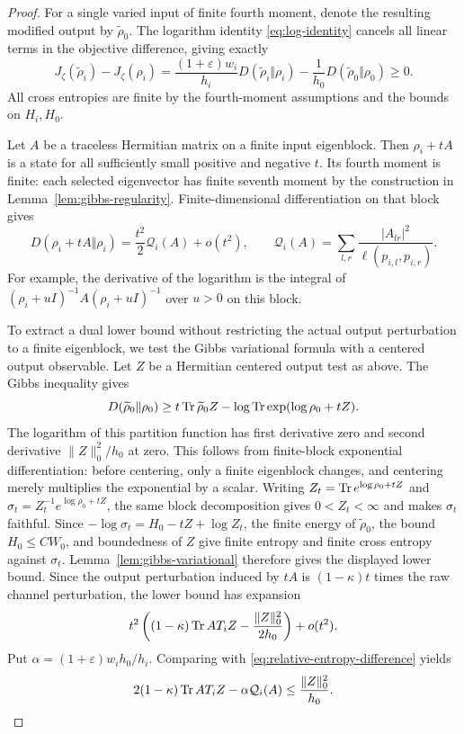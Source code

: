 \begin{proof}
For a single varied input of finite fourth moment, denote the
resulting modified output by $\widetilde\rho_0$. The logarithm
identity \eqref{eq:log-identity} cancels all linear terms in the
objective difference, giving exactly
\begin{equation}\label{eq:relative-entropy-difference}
 J_\zeta(\widetilde\rho_i)-J_\zeta(\rho_i)
 =\frac{(1+\varepsilon)w_i}{h_i}
        D(\widetilde\rho_i\Vert\rho_i)
  -\frac1{h_0}D(\widetilde\rho_0\Vert\rho_0)\ge0.
\end{equation}
All cross entropies are finite by the fourth-moment assumptions and
the bounds on $H_i,H_0$.

Let $A$ be a traceless Hermitian matrix on a finite input eigenblock.
Then $\rho_i+tA$ is a state for all sufficiently small positive and
negative $t$. Its fourth moment is finite: each selected eigenvector
has finite seventh moment by the construction in
Lemma~\ref{lem:gibbs-regularity}. Finite-dimensional differentiation
on that block gives
\[
 D(\rho_i+tA\Vert\rho_i)
 =\frac{t^2}{2}\mathcal Q_i(A)+o(t^2),\qquad
 \mathcal Q_i(A)=\sum_{l,r}
       \frac{|A_{lr}|^2}{\ell(p_{i,l},p_{i,r})}.
\]
For example, the derivative of the logarithm is the integral of
$(\rho_i+uI)^{-1}A(\rho_i+uI)^{-1}$ over $u>0$ on this block.

To extract a dual lower bound without restricting the actual output
perturbation to a finite eigenblock, we test the Gibbs variational formula
with a centered output observable. Let $Z$ be a Hermitian centered output
test as above. The Gibbs
inequality gives
\[
 D(\widetilde\rho_0\Vert\rho_0)
 \ge t\operatorname{Tr}\widetilde\rho_0Z
    -\log\operatorname{Tr}\exp(\log\rho_0+tZ).
\]
The logarithm of this partition function has first derivative zero
and second derivative $\|Z\|_0^2/h_0$ at zero. This follows from
finite-block exponential differentiation: before centering, only a
finite eigenblock changes, and centering merely multiplies the
exponential by a scalar. Writing $Z_t=\operatorname{Tr} e^{\log\rho_0+tZ}$ and
$\sigma_t=Z_t^{-1}e^{\log\rho_0+tZ}$, the same block decomposition
gives $0<Z_t<\infty$ and makes $\sigma_t$ faithful.
Since $-\log\sigma_t=H_0-tZ+\log Z_t$, the finite energy of
$\widetilde\rho_0$, the bound $H_0\le CW_0$, and boundedness of $Z$
give finite entropy and finite cross entropy against $\sigma_t$.
Lemma~\ref{lem:gibbs-variational} therefore gives the displayed lower bound.
Since the output perturbation induced by
$tA$ is $(1-\kappa)t$ times the raw channel perturbation, the lower
bound has expansion
\[
 t^2\left((1-\kappa)\operatorname{Tr} A T_iZ
             -\frac{\|Z\|_0^2}{2h_0}\right)+o(t^2).
\]
Put $\alpha=(1+\varepsilon)w_i h_0/h_i$. Comparing with
\eqref{eq:relative-entropy-difference} yields
\begin{equation}\label{eq:hessian-duality}
 2(1-\kappa)\operatorname{Tr} A T_iZ-\alpha\mathcal Q_i(A)
 \le\frac{\|Z\|_0^2}{h_0}.
\end{equation}


\end{proof}
